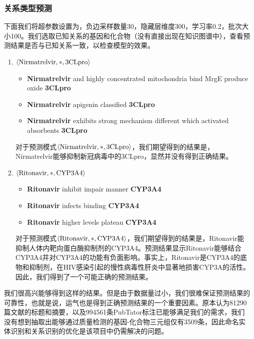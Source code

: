 \documentclass[twocolumn]{article}
\begin{document}
\subsubsection{关系类型预测}
下面我们将超参数设置为，负边采样数量30，隐藏层维度300，学习率0.2，批次大小100。我们选取已知关系的基因和化合物（没有直接出现在知识图谱中），查看预测结果是否与已知关系一致，以检查模型的效果。\par
\begin{enumerate}
	\item $\langle \textnormal{Nirmatrelvir}, *, \textnormal{3CLpro}\rangle$\par
	\begin{itemize}
		\item \textbf{Nirmatrelvir} and highly concentrated mitochondria bind MrgE produce oxide \textbf{3CLpro}
		\item \textbf{Nirmatrelvir} apigenin classified \textbf{3CLpro}
		\item \textbf{Nirmatrelvir} exhibits strong mechanism different which activated absorbents \textbf{3CLpro}
	\end{itemize}\par
	对于预测模式$\langle \textnormal{Nirmatrelvir}, *, \textnormal{3CLpro}\rangle$，我们期望得到的结果是，Nirmatrelvir能够抑制新冠病毒中的3CLpro，显然并没有得到正确结果。
	\item $\langle \textnormal{Ritonavir}, *, \textnormal{CYP3A4}\rangle$\par
	\begin{itemize}
		\item \textbf{Ritonavir} inhibit impair manner \textbf{CYP3A4}
		\item \textbf{Ritonavir} infects binding \textbf{CYP3A4}
		\item \textbf{Ritonavir} higher levels plateau \textbf{CYP3A4}
	\end{itemize}
	对于预测模式$\langle \textnormal{Ritonavir}, *, \textnormal{CYP3A4}\rangle$，我们期望得到的结果是，Ritonavir能抑制人体内靶向蛋白酶抑制剂的CYP3A4。预测结果显示Ritonavir能够结合CYP3A4并对CYP3A4的功能有负面影响。事实上，Ritonavir是CYP3A4的底物和抑制剂，在HIV感染引起的慢性病毒性肝炎中显著地损害CYP3A的活性\cite{ritonavir1, ritonavir2}。因此，我们得到了一个可能正确的预测结果。
\end{enumerate}\par
我们很高兴能够得到这样的结果。但是由于数据量过小，我们很难保证预测结果的可靠性，也就是说，运气也是得到正确预测结果的一个重要因素。原本认为81290篇文献的标题和摘要，以及994561条PubTator标注已能够满足我们的需求，我们没有想到抽取出能够通过质量检测的基因-化合物三元组仅有3509条，因此命名实体识别和关系识别的优化是该项目中仍需解决的问题。\par
\end{document}
